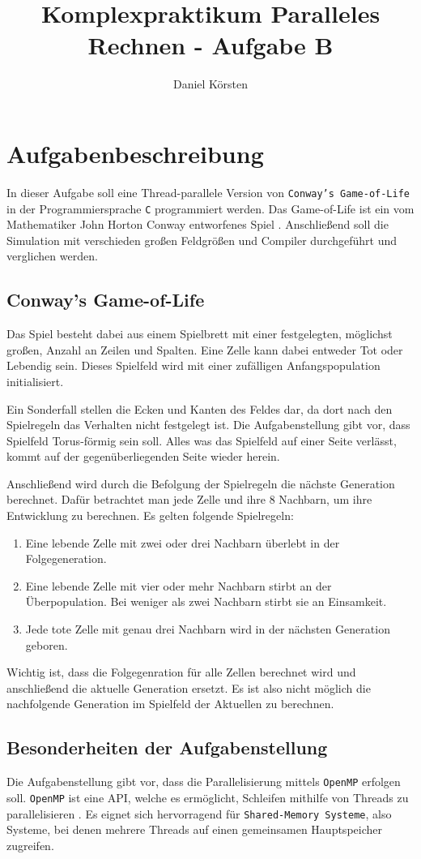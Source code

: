 \documentclass[german,plainarticle,hyperref,utf8]{zihpub}
\author{Daniel Körsten}
\title{Komplexpraktikum Paralleles Rechnen - Aufgabe B}
\begin{document}
	\section{Aufgabenbeschreibung}
	In dieser Aufgabe soll eine Thread-parallele Version von \texttt{Conway’s Game-of-Life} in der Programmiersprache \texttt{C} programmiert werden. Das Game-of-Life ist ein vom Mathematiker John Horton Conway entworfenes Spiel \cite{gardner}.
	Anschließend soll die Simulation mit verschieden großen Feldgrößen und Compiler durchgeführt und verglichen werden.
	
	\subsection{Conway’s Game-of-Life}
	Das Spiel besteht dabei aus einem Spielbrett mit einer festgelegten, möglichst großen, Anzahl an Zeilen und Spalten. Eine Zelle kann dabei entweder Tot oder Lebendig sein. Dieses Spielfeld wird mit einer zufälligen Anfangspopulation initialisiert.
	
	Ein Sonderfall stellen die Ecken und Kanten des Feldes dar, da dort nach den Spielregeln das Verhalten nicht festgelegt ist. Die Aufgabenstellung gibt vor, dass Spielfeld Torus-förmig sein soll. Alles was das Spielfeld auf einer Seite verlässt, kommt auf der gegenüberliegenden Seite wieder herein.
	
	Anschließend wird durch die Befolgung der Spielregeln die nächste Generation berechnet. Dafür betrachtet man jede Zelle und ihre 8 Nachbarn, um ihre Entwicklung zu berechnen. Es gelten folgende Spielregeln:
	\begin{enumerate}
		\item Eine lebende Zelle mit zwei oder drei Nachbarn überlebt in der Folgegeneration.
		\item Eine lebende Zelle mit vier oder mehr Nachbarn stirbt an der Überpopulation. Bei weniger als zwei Nachbarn stirbt sie an Einsamkeit.
		\item Jede tote Zelle mit genau drei Nachbarn wird in der nächsten Generation geboren.
	\end{enumerate}
	Wichtig ist, dass die Folgegenration für alle Zellen berechnet wird und anschließend die aktuelle Generation ersetzt. Es ist also nicht möglich die nachfolgende Generation im Spielfeld der Aktuellen zu berechnen.
	
	\subsection{Besonderheiten der Aufgabenstellung}
	Die Aufgabenstellung gibt vor, dass die Parallelisierung mittels \texttt{OpenMP} erfolgen soll. \texttt{OpenMP} ist eine API, welche es ermöglicht, Schleifen mithilfe von Threads zu parallelisieren \cite{openmp}. Es eignet sich hervorragend für \texttt{Shared-Memory Systeme}, also Systeme, bei denen mehrere Threads auf einen gemeinsamen Hauptspeicher zugreifen.
	
\end{document}
